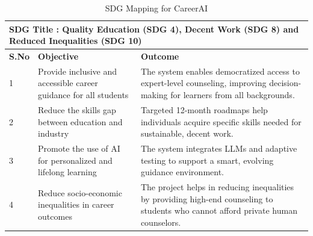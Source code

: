 \begin{table}[H]
\centering
\caption{SDG Mapping for CareerAI}
\begin{tabular}{|l|p{6cm}|p{8cm}|}
\hline
\multicolumn{3}{|l|}{\textbf{SDG Title : Quality Education (SDG 4), Decent Work (SDG 8) and Reduced Inequalities (SDG 10)}} \\
\hline
\textbf {S.No} & \textbf{Objective} & \textbf{Outcome}\\
\hline

1 & Provide inclusive and accessible career guidance for all students 
& The system enables democratized access to expert-level counseling, improving decision-making for learners from all backgrounds. \\

\hline

2 & Reduce the skills gap between education and industry 
& Targeted 12-month roadmaps help individuals acquire specific skills needed for sustainable, decent work. \\

\hline

3 & Promote the use of AI for personalized and lifelong learning 
& The system integrates LLMs and adaptive testing to support a smart, evolving guidance environment. \\

\hline

4 & Reduce socio-economic inequalities in career outcomes 
& The project helps in reducing inequalities by providing high-end counseling to students who cannot afford private human counselors. \\

\hline

\end{tabular}

\label{tab:merged}
\end{table}
